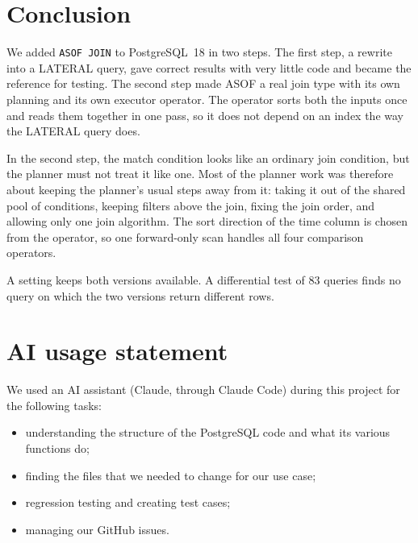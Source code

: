 \documentclass[11pt,a4paper]{article}
\newcommand{\code}[1]{\texttt{#1}}
\begin{document}
\section{Conclusion}

We added \code{ASOF JOIN} to PostgreSQL~18 in two steps. The first step, a rewrite into a
LATERAL query, gave correct results with very little code and became the reference for
testing. The second step made ASOF a real join type with its own planning and its own
executor operator. The operator sorts both the inputs once and reads them together in
one pass, so it does not depend on an index the way the LATERAL query does.

In the second step, the match condition looks like an ordinary join condition, but the
planner must not treat it like one. Most of the planner work was therefore about keeping
the planner's usual steps away from it: taking it out of the shared pool of conditions,
keeping filters above the join, fixing the join order, and allowing only one join
algorithm. The sort direction of the time column is chosen from the operator, so one
forward-only scan handles all four comparison operators.

A setting keeps both versions available. A differential test of 83 queries finds no
query on which the two versions return different rows.

\section*{AI usage statement}

We used an AI assistant (Claude, through Claude Code) during this project for the
following tasks:

\begin{itemize}
  \item understanding the structure of the PostgreSQL code and what its various
        functions do;
  \item finding the files that we needed to change for our use case;
  \item regression testing and creating test cases;
  \item managing our GitHub issues.
\end{itemize}
\end{document}
